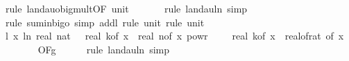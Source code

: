 \begin{isabellebody}
\ {\isacharparenleft}{\kern0pt}rule\ landau{\isacharunderscore}{\kern0pt}o{\isachardot}{\kern0pt}big{\isacharunderscore}{\kern0pt}mult{\isacharunderscore}{\kern0pt}{}{\isacharprime}{\kern0pt}{\isacharbrackleft}{\kern0pt}OF\ unit{\isacharunderscore}{\kern0pt}{}{\isacharbrackright}{\kern0pt}{\isacharparenright}{\kern0pt}\isanewline
\ \ \ \ \ \isamarkupfalse%
\ {\isacharparenleft}{\kern0pt}rule\ landau{\isacharunderscore}{\kern0pt}ln{\isacharunderscore}{\kern0pt}{}{\isacharcomma}{\kern0pt}\ simp{\isacharparenright}{\kern0pt}\isanewline
\ \ \ \ \isamarkupfalse%
\ {\isacharparenleft}{\kern0pt}rule\ sum{\isacharunderscore}{\kern0pt}in{\isacharunderscore}{\kern0pt}bigo{\isacharcomma}{\kern0pt}\ simp\ add{\isacharcolon}{\kern0pt}l{}{\isacharcomma}{\kern0pt}\ rule\ unit{\isacharunderscore}{\kern0pt}{}{\isacharcomma}{\kern0pt}\ rule\ unit{\isacharunderscore}{\kern0pt}{}{\isacharparenright}{\kern0pt}\isanewline
\isanewline
\ \ \isamarkupfalse%
\ l{}{\isacharcolon}{\kern0pt}\ {\isachardoublequoteopen}{\isacharparenleft}{\kern0pt}{\isasymlambda}x{\isachardot}{\kern0pt}\ ln\ {\isacharparenleft}{\kern0pt}real\ {\isacharparenleft}{\kern0pt}nat\ {\isasymlceil}{}\ {\isacharasterisk}{\kern0pt}\ real\ {\isacharparenleft}{\kern0pt}k{\isacharunderscore}{\kern0pt}of\ x{\isacharparenright}{\kern0pt}\ {\isacharasterisk}{\kern0pt}\ real\ {\isacharparenleft}{\kern0pt}n{\isacharunderscore}{\kern0pt}of\ x{\isacharparenright}{\kern0pt}\ powr\ {\isacharparenleft}{\kern0pt}{}\ {\isacharminus}{\kern0pt}\ {}\ {\isacharslash}{\kern0pt}\ real\ {\isacharparenleft}{\kern0pt}k{\isacharunderscore}{\kern0pt}of\ x{\isacharparenright}{\kern0pt}{\isacharparenright}{\kern0pt}\ {\isacharslash}{\kern0pt}\ {\isacharparenleft}{\kern0pt}real{\isacharunderscore}{\kern0pt}of{\isacharunderscore}{\kern0pt}rat\ {\isacharparenleft}{\kern0pt}{\isasymdelta}{\isacharunderscore}{\kern0pt}of\ x{\isacharparenright}{\kern0pt}{\isacharparenright}{\kern0pt}\ {\isacharplus}{\kern0pt}\ {}{\isacharparenright}{\kern0pt}{\isacharparenright}{\kern0pt}\ \isanewline
\ \ \ \ {\isasymin}\ O{\isacharbrackleft}{\kern0pt}{\isacharquery}{\kern0pt}F{\isacharbrackright}{\kern0pt}{\isacharparenleft}{\kern0pt}g{\isacharparenright}{\kern0pt}{\isachardoublequoteclose}\isanewline
\ \ \ \ \isamarkupfalse%
\ {\isacharparenleft}{\kern0pt}rule\ landau{\isacharunderscore}{\kern0pt}ln{\isacharunderscore}{\kern0pt}{}{\isacharcomma}{\kern0pt}\ simp{\isacharparenright}{\kern0pt}\isanewline

\end{isabellebody}
